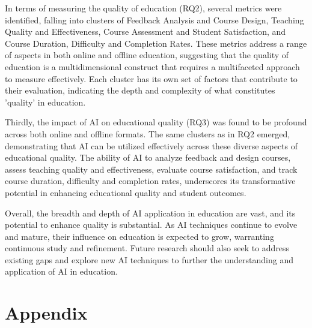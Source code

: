 \documentclass{svproc}
\begin{document}
In terms of measuring the quality of education (RQ2), several metrics were identified, falling into clusters of Feedback Analysis and Course Design, Teaching Quality and Effectiveness, Course Assessment and Student Satisfaction, and Course Duration, Difficulty and Completion Rates. These metrics address a range of aspects in both online and offline education, suggesting that the quality of education is a multidimensional construct that requires a multifaceted approach to measure effectively. Each cluster has its own set of factors that contribute to their evaluation, indicating the depth and complexity of what constitutes 'quality' in education.

Thirdly, the impact of AI on educational quality (RQ3) was found to be profound across both online and offline formats. The same clusters as in RQ2 emerged, demonstrating that AI can be utilized effectively across these diverse aspects of educational quality. The ability of AI to analyze feedback and design courses, assess teaching quality and effectiveness, evaluate course satisfaction, and track course duration, difficulty and completion rates, underscores its transformative potential in enhancing educational quality and student outcomes.


Overall, the breadth and depth of AI application in education are vast, and its potential to enhance quality is substantial. As AI techniques continue to evolve and mature, their influence on education is expected to grow, warranting continuous study and refinement. Future research should also seek to address existing gaps and explore new AI techniques to further the understanding and application of AI in education.

\section{Appendix}
\label{Appendix}
\end{document}
